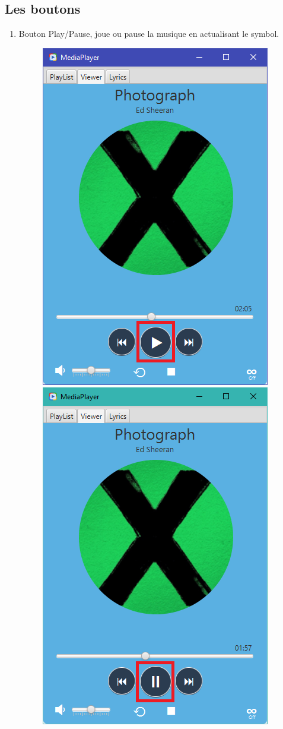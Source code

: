 \documentclass[a4paper,12pt]{report} %
\begin{document}
\subsection{Les boutons} \label{subSec:bouton}

			\begin{enumerate}
   		\item Bouton Play/Pause, joue ou pause la musique en actualisant le symbol.
   			\begin{figure}[ht] 		
				\centering
  				\includegraphics[scale=0.6]{play}
  				\hspace{5mm}
  				\includegraphics[scale=0.6]{pause}

\end{figure}
\end{enumerate}
\end{document}
